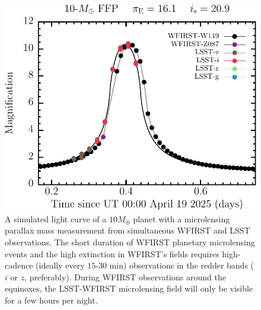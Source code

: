 
\begin{figure}[t]
\centering\includegraphics[width=0.5\linewidth]{figs/WFIRST/lsst_lsstm+10_0_7220351_320_det_lc.pdf}
\caption{A simulated light curve of a $10 M_{\oplus}$ planet with a microlensing parallax
mass measurement from simultaneous WFIRST and LSST observations. The short duration of WFIRST planetary microlensing events and the high extinction in WFIRST's fields requires high-cadence (ideally every $15$-$30$ min) observations in the redder bands ($i$ or $z$, preferably). During WFIRST observations around the equinoxes, the LSST-WFIRST microlensing field will only be visible for a few hours per night.}
\label{fig-lc}
\end{figure}


